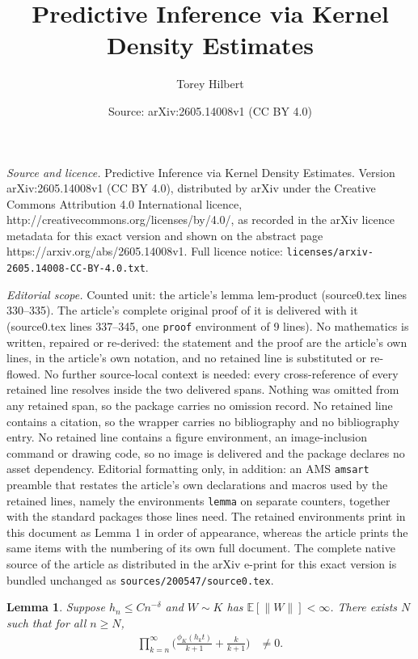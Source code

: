 \documentclass[10pt,a4paper]{amsart}
\title{Predictive Inference via Kernel Density Estimates}
\author{Torey Hilbert}
\date{Source: arXiv:2605.14008v1 (CC BY 4.0)}
\newtheorem{lemma}{Lemma}
\newcommand{\E}{\mathbb{E}}
\begin{document}
\maketitle

\noindent\emph{Source and licence.} Predictive Inference via Kernel Density Estimates. Version arXiv:2605.14008v1 (CC BY 4.0), distributed by arXiv under the Creative Commons Attribution 4.0 International licence, http://creativecommons.org/licenses/by/4.0/, as recorded in the arXiv licence metadata for this exact version and shown on the abstract page https://arxiv.org/abs/2605.14008v1. Full licence notice: \texttt{licenses/arxiv-2605.14008-CC-BY-4.0.txt}.\par\smallskip

\noindent\textit{Editorial scope.} Counted unit: the article's lemma lem-product (source0.tex lines 330--335). The article's complete original proof of it is delivered with it (source0.tex lines 337--345, one \texttt{proof} environment of 9 lines). No mathematics is written, repaired or re-derived: the statement and the proof are the article's own lines, in the article's own notation, and no retained line is substituted or re-flowed.  No further source-local context is needed: every cross-reference of every retained line resolves inside the two delivered spans.  Nothing was omitted from any retained span, so the package carries no omission record.  No retained line contains a citation, so the wrapper carries no bibliography and no bibliography entry.  No retained line contains a figure environment, an image-inclusion command or drawing code, so no image is delivered and the package declares no asset dependency.  Editorial formatting only, in addition: an AMS \texttt{amsart} preamble that restates the article's own declarations and macros used by the retained lines, namely the environments \texttt{lemma} on separate counters, together with the standard packages those lines need.  The retained environments print in this document as Lemma 1 in order of appearance, whereas the article prints the same items with the numbering of its own full document.  The complete native source of the article as distributed in the arXiv e-print for this exact version is bundled unchanged as \texttt{sources/200547/source0.tex}.
\begin{lemma}\label{lem-product}
Suppose $h_n \leq Cn^{-\delta}$ and $W \sim K$ has $\E[\|W\|] < \infty$. There exists $N$ such that for all $n \geq N$,
\begin{align}
    \prod_{k = n}^\infty \bigg(\frac{\phi_K(h_k t)}{k+1} + \frac{k}{k+1}\bigg) &\neq 0. \label{eq-nonzero}
\end{align}
\end{lemma}
\end{document}
